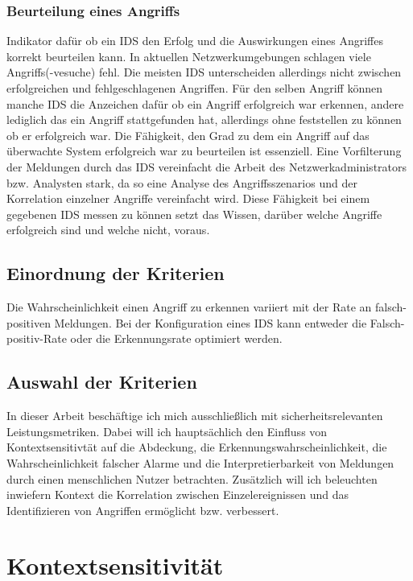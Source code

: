 \subsubsection{Beurteilung  eines Angriffs}
Indikator dafür ob ein IDS den Erfolg und die Auswirkungen eines Angriffes korrekt beurteilen kann. In aktuellen Netzwerkumgebungen schlagen viele Angriffs(-vesuche) fehl. Die meisten IDS unterscheiden allerdings nicht zwischen erfolgreichen und fehlgeschlagenen Angriffen. Für den selben Angriff können manche IDS die Anzeichen dafür ob ein Angriff erfolgreich war erkennen, andere lediglich das ein Angriff stattgefunden hat, allerdings ohne feststellen zu können ob er erfolgreich war. Die Fähigkeit, den Grad zu dem ein Angriff auf das überwachte System erfolgreich war zu beurteilen ist essenziell. Eine Vorfilterung der Meldungen durch das IDS vereinfacht die Arbeit des Netzwerkadministrators bzw. Analysten stark, da so eine Analyse des Angriffsszenarios und der Korrelation einzelner Angriffe vereinfacht wird. Diese Fähigkeit bei einem gegebenen IDS messen zu können setzt das Wissen, darüber welche Angriffe erfolgreich sind und welche nicht, voraus.


\subsection{Einordnung der Kriterien}
Die Wahrscheinlichkeit einen Angriff zu erkennen variiert mit der Rate an falsch-positiven Meldungen. Bei der Konfiguration eines IDS kann entweder die Falsch-positiv-Rate oder die Erkennungsrate optimiert werden.

\subsection{Auswahl der Kriterien}
\cite{milenkoski_evaluating_2015}
In dieser Arbeit beschäftige ich mich ausschließlich mit sicherheitsrelevanten Leistungsmetriken. Dabei will ich hauptsächlich den Einfluss von Kontextsensitivtät auf die Abdeckung, die Erkennungswahrscheinlichkeit, die Wahrscheinlichkeit  falscher Alarme und die Interpretierbarkeit von Meldungen durch einen menschlichen Nutzer betrachten. Zusätzlich will ich beleuchten inwiefern Kontext die Korrelation zwischen Einzelereignissen und das Identifizieren von Angriffen ermöglicht bzw. verbessert.
\section{Kontextsensitivität}